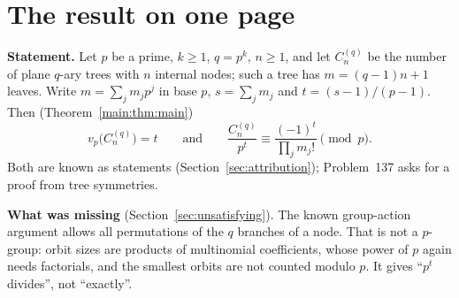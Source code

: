 \documentclass[11pt]{article}
\theoremstyle{definition}
\theoremstyle{remark}
\numberwithin{equation}{section}
\numberwithin{figure}{section}
\begin{document}
\section*{The result on one page}\label{sec:onepage}

\noindent\textbf{Statement.} Let $p$ be a prime, $k\ge1$, $q=p^k$, $n\ge1$, and let $C_n^{(q)}$ be the number
of plane $q$-ary trees with $n$ internal nodes; such a tree has $m=(q-1)n+1$ leaves. Write $m=\sum_jm_jp^j$
in base $p$, $s=\sum_jm_j$ and $t=(s-1)/(p-1)$. Then (Theorem~\ref{main:thm:main})
\[
 v_p\bigl(C_n^{(q)}\bigr)=t\qquad\text{and}\qquad\frac{C_n^{(q)}}{p^t}\equiv\frac{(-1)^t}{\prod_jm_j!}\pmod p .
\]
Both are known as statements (Section~\ref{sec:attribution}); Problem~137 asks for a proof from tree symmetries.

\noindent\textbf{What was missing} (Section~\ref{sec:unsatisfying}). The known group-action argument
\cite{Konvalinka} allows all permutations of the $q$ branches of a node. That is not a $p$-group: orbit sizes
are products of multinomial coefficients, whose power of $p$ again needs factorials, and the smallest orbits
are not counted modulo $p$. It gives ``$p^t$ divides'', not ``exactly''.
\end{document}
